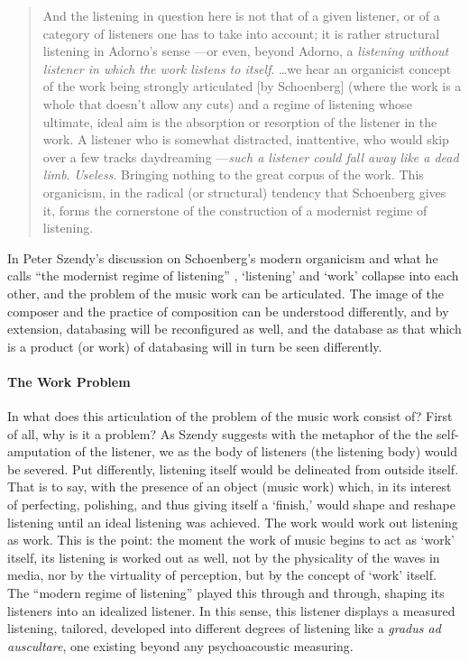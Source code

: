 \begin{quote}
	And the listening in question here is not that of a given listener, or of a category of listeners one has to take into account; it is rather structural listening in Adorno's sense ---or even, beyond Adorno, a \textit{listening without listener in which the work listens to itself}. \dots we hear an organicist concept of the work being strongly articulated [by Schoenberg] (where the work is a whole that doesn't allow any cuts) and a regime of listening whose ultimate, ideal aim is the absorption or resorption of the listener in the work. A listener who is somewhat distracted, inattentive, who would skip over a few tracks daydreaming ---\textit{such a listener could fall away like a dead limb}. \textit{Useless}. Bringing nothing to the great corpus of the work. This organicism, in the radical (or structural) tendency that Schoenberg gives it, forms the cornerstone of the construction of a modernist regime of listening. \im \parencite[127]{Sze08:Lis}
\end{quote}
In Peter Szendy's discussion on Schoenberg's modern organicism and what he calls ``the modernist regime of listening'' \parencite{Sze08:Lis}, `listening' and `work' collapse into each other, and the problem of the music work can be articulated. The image of the composer and the practice of composition can be understood differently, and by extension, databasing will be reconfigured as well, and the database as that which is a product (or work) of databasing will in turn be seen differently.

\paragraph{The Work Problem}
In what does this articulation of the problem of the music work consist of? First of all, why is it a problem? As Szendy suggests with the metaphor of the the self-amputation of the listener, we as the body of listeners (the listening body) would be severed. Put differently, listening itself would be delineated from outside itself. That is to say, with the presence of an object (music work) which, in its interest of perfecting, polishing, and thus giving itself a `finish,' would shape and reshape listening until an ideal listening was achieved. The work would work out listening as work. This is the point: the moment the work of music begins to act as `work' itself, its listening is worked out as well, not by the physicality of the waves in media, nor by the virtuality of perception, but by the concept of `work' itself. The ``modern regime of listening'' played this through and through, shaping its listeners into an idealized listener. In this sense, this listener displays a measured listening, tailored, developed into different degrees of listening like a \textit{gradus ad auscultare}, one existing beyond any psychoacoustic measuring.

